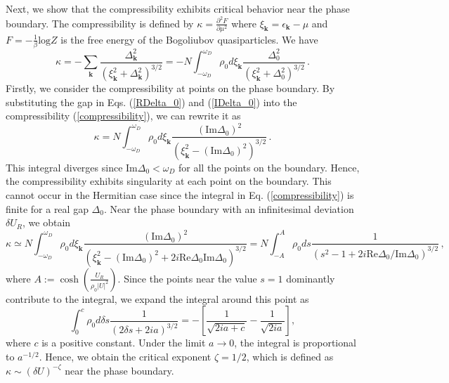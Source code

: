 \documentclass[aps,onecolumn,superscriptaddress,notitlepage,longbibliography]{revtex4-1}
\begin{document}
Next, we show that the compressibility exhibits critical behavior near the phase boundary. The compressibility is defined by $\kappa=\frac{\partial^2F}{\partial\mu^2}$ where $\xi_{\bm{k}}=\epsilon_{\bm{k}}-\mu$ and $F=-\frac{1}{\beta}\text{log}Z$ is the free energy of the Bogoliubov quasiparticles. We have
\begin{equation}
  \kappa = - \sum_{\bm{k}} \frac{\Delta_{\bm{k}}^2}{(\xi_{\bm{k}}^2 +
  \Delta_{\bm{k}}^2)^{3 / 2}} = - N\int_{- \omega_D}^{\omega_D} \rho_0 d
  \xi_{\bm{k}} \frac{\Delta_0^2}{(\xi_{\bm{k}}^2 + \Delta_0^2)^{3
  / 2}}\,.
  \label{compressibility}
\end{equation}
Firstly, we consider the compressibility at points on the phase boundary. By substituting the gap in Eqs. (\ref{RDelta_0}) and (\ref{IDelta_0}) into the compressibility (\ref{compressibility}), we can rewrite it as
\begin{equation}
  \kappa= N\int_{- \omega_D}^{\omega_D} \rho_0 d \xi_{\bm{k}}
  \frac{(\text{Im} \Delta_0)^2}{(\xi_{\bm{k}}^2 - (\text{Im}
  \Delta_0)^2)^{3 / 2}}\,.
\end{equation}
This integral diverges since $\text{Im} \Delta_0 < \omega_D$ for all the points on the boundary. Hence, the compressibility exhibits singularity at each point on the boundary. This cannot occur in the Hermitian case since the integral in Eq. (\ref{compressibility}) is finite for a real gap $\Delta_0$. Near the phase boundary with an infinitesimal deviation $\delta U_R$, we obtain
\begin{equation}
	\kappa\simeq N\int_{- \omega_D}^{\omega_D} \rho_0 d \xi_{\bm{k}}
  \frac{(\text{Im} \Delta_0)^2}{(\xi_{\bm{k}}^2 - (\text{Im} \Delta_0)^2
  + 2 i \text{Re} \Delta_0 \text{Im} \Delta_0)^{3 / 2}} = N\int_{- A}^A \rho_0
  ds \frac{1}{(s^2 - 1 + 2 i \text{Re}
  \Delta_0 / \text{Im} \Delta_0)^{3 / 2}}\,,
\end{equation}
where $A := \cosh \left( \frac{U_R}{\rho_0 | U |^2} \right)$. Since the points near the value $s = 1$ dominantly contribute to the integral, we expand the integral around this point as
\begin{equation}
  \int_{0}^{c} \rho_0 d \delta s \frac{1}{(2 \delta
  s+ 2 i a)^{3 / 2}}=-[\frac{1}{\sqrt{2ia+c}}-\frac{1}{\sqrt{2ia}}],
\end{equation}
where $c$ is a positive constant. Under the limit $a\to0$, the integral is proportional to $a^{-1/2}$. Hence, we obtain the critical exponent $\zeta = 1 / 2$, which is defined as $\kappa \sim (\delta U)^{- \zeta}$ near the phase boundary.
\end{document}
